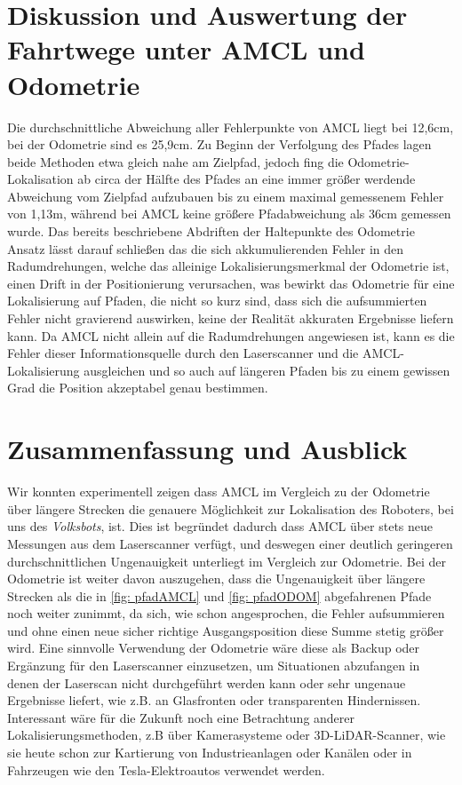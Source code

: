 \documentclass[11pt,a4paper]{article}
\begin{document}
\section{Diskussion und Auswertung der Fahrtwege unter AMCL und Odometrie}
Die durchschnittliche Abweichung aller Fehlerpunkte von AMCL liegt bei 12,6cm, bei der Odometrie sind es 25,9cm. Zu Beginn der Verfolgung des Pfades lagen beide Methoden 
etwa gleich nahe am Zielpfad, jedoch fing die Odometrie-Lokalisation  ab circa der Hälfte des Pfades an eine immer größer werdende Abweichung vom Zielpfad aufzubauen bis 
zu einem maximal gemessenem Fehler von 1,13m, während bei AMCL keine größere Pfadabweichung als 36cm gemessen wurde. Das bereits beschriebene Abdriften der 
Haltepunkte des Odometrie Ansatz lässt darauf schließen das die sich akkumulierenden Fehler in den Radumdrehungen, welche das alleinige Lokalisierungsmerkmal 
der Odometrie ist, einen Drift in der Positionierung verursachen, was bewirkt das Odometrie für eine Lokalisierung auf Pfaden, die nicht so kurz sind, dass sich die
aufsummierten Fehler nicht gravierend auswirken, keine der Realität akkuraten Ergebnisse liefern kann. Da AMCL nicht allein auf die Radumdrehungen angewiesen ist, kann es 
die Fehler dieser Informationsquelle durch den Laserscanner und die AMCL-Lokalisierung ausgleichen und so auch auf längeren Pfaden bis zu einem gewissen Grad die Position 
akzeptabel genau bestimmen.

\section{Zusammenfassung und Ausblick}
Wir konnten experimentell zeigen dass AMCL im Vergleich zu der Odometrie über längere Strecken die genauere Möglichkeit zur Lokalisation
des Roboters, bei uns des \textit{Volksbots}, ist. Dies ist begründet dadurch dass AMCL über stets neue Messungen aus dem Laserscanner  
verfügt, und deswegen einer deutlich geringeren durchschnittlichen Ungenauigkeit unterliegt im Vergleich zur Odometrie. Bei der Odometrie
ist weiter davon auszugehen, dass die Ungenauigkeit über längere Strecken als die in \ref*{fig: pfadAMCL} und \ref*{fig: pfadODOM} abgefahrenen Pfade noch weiter
zunimmt, da sich, wie schon angesprochen, die Fehler aufsummieren und ohne einen neue sicher richtige Ausgangsposition diese Summe stetig größer wird.
Eine sinnvolle Verwendung der Odometrie wäre diese als Backup oder Ergänzung für den Laserscanner einzusetzen, um Situationen abzufangen in denen der Laserscan nicht durchgeführt werden kann
oder sehr ungenaue Ergebnisse liefert, wie z.B. an Glasfronten oder transparenten Hindernissen.
Interessant wäre für die Zukunft noch eine Betrachtung anderer Lokalisierungsmethoden, z.B über Kamerasysteme oder 3D-LiDAR-Scanner, wie sie heute schon
zur Kartierung von Industrieanlagen oder Kanälen \cite{uniinspector} oder in Fahrzeugen wie den Tesla-Elektroautos \cite{website:tesla} verwendet werden.
\end{document}
